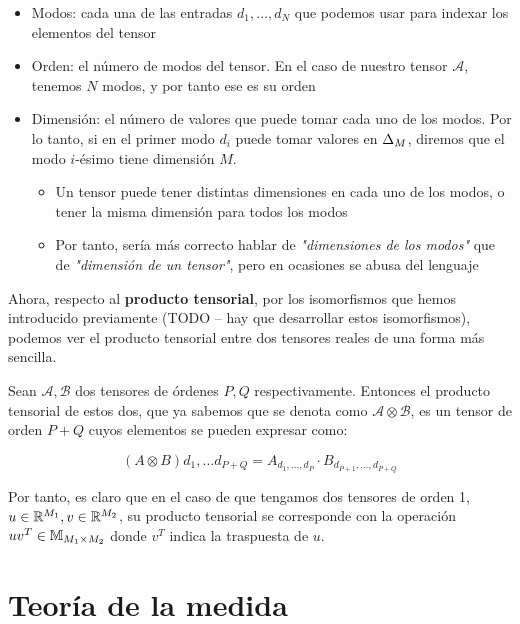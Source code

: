 \begin{itemize}
    \item Modos: cada una de las entradas $d_1, \ldots, d_N$ que podemos usar para indexar los elementos del tensor
    \item Orden: el número de modos del tensor. En el caso de nuestro tensor $\mathcal{A}$, tenemos $N$ modos, y por tanto ese es su orden
    \item Dimensión: el número de valores que puede tomar cada uno de los modos. Por lo tanto, si en el primer modo $d_i$ puede tomar valores en $\Delta_{M}$, diremos que el modo $i$-ésimo tiene dimensión $M$.
        \begin{itemize}
            \item Un tensor puede tener distintas dimensiones en cada uno de los modos, o tener la misma dimensión para todos los modos
            \item Por tanto, sería más correcto hablar de \textit{"dimensiones de los modos"} que de \textit{"dimensión de un tensor"}, pero en ocasiones se abusa del lenguaje
        \end{itemize}
\end{itemize}

Ahora, respecto al \textbf{producto tensorial}, por los isomorfismos que hemos introducido previamente (TODO -- hay que desarrollar estos isomorfismos), podemos ver el producto tensorial entre dos tensores reales de una forma más sencilla.

Sean $\mathcal{A}, \mathcal{B}$ dos tensores de órdenes $P, Q$ respectivamente. Entonces el producto tensorial de estos dos, que ya sabemos que se denota como $\mathcal{A} \otimes \mathcal{B}$, es un tensor de orden $P + Q$ cuyos elementos se pueden expresar como:

$$(A \otimes B)d_1, \ldots d_{P + Q} = A_{d_1, \ldots, d_P} \cdot B_{d_{P + 1}, \ldots, d_{P + Q}}$$

Por tanto, es claro que en el caso de que tengamos dos tensores de orden 1, $u \in \mathbb{R}^{M_1}, v \in \mathbb{R}^{M_2}$, su producto tensorial se corresponde con la operación $u v^T \in \mathbb{M}_{M_1 \times M_2}$ donde $v^T$ indica la traspuesta de $u$.

\newpage
\section{Teoría de la medida}

\endinput
